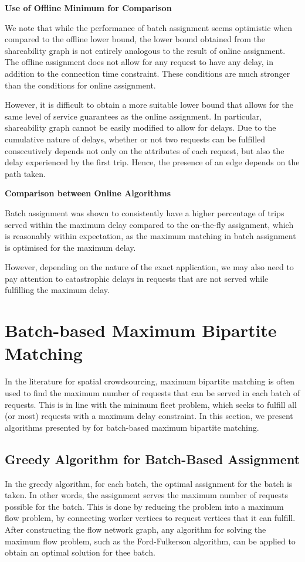 \documentclass[urop]{socreport}
\begin{document}
\vspace{2mm} \noindent \textbf{Use of Offline Minimum for Comparison}

\noindent We note that while the performance of batch assignment seems optimistic when compared to the offline lower bound, the lower bound obtained from the shareability graph is not entirely analogous to the result of online assignment. The offline assignment does not allow for any request to have any delay, in addition to the connection time constraint. These conditions are much stronger than the conditions for online assignment.

However, it is difficult to obtain a more suitable lower bound that allows for the same level of service guarantees as the online assignment. In particular, shareability graph cannot be easily modified to allow for delays. Due to the cumulative nature of delays, whether or not two requests can be fulfilled consecutively depends not only on the attributes of each request, but also the delay experienced by the first trip. Hence, the presence of an edge depends on the path taken.

\vspace{2mm} \noindent \textbf{Comparison between Online Algorithms}

\noindent Batch assignment was shown to consistently have a higher percentage of trips served within the maximum delay compared to the on-the-fly assignment, which is reasonably within expectation, as the maximum matching in batch assignment is optimised for the maximum delay.

However, depending on the nature of the exact application, we may also need to pay attention to catastrophic delays in requests that are not served while fulfilling the maximum delay.

\section{Batch-based Maximum Bipartite Matching}
In the literature for spatial crowdsourcing, maximum bipartite matching is often used to find the maximum number of requests that can be served in each batch of requests. This is in line with the minimum fleet problem, which seeks to fulfill all (or most) requests with a maximum delay constraint. In this section, we present algorithms presented by \cite{kazemi} for batch-based maximum bipartite matching.

\subsection{Greedy Algorithm for Batch-Based Assignment}
In the greedy algorithm, for each batch, the optimal assignment for the batch is taken. In other words, the assignment serves the maximum number of requests possible for the batch. This is done by reducing the problem into a maximum flow problem, by connecting worker vertices to request vertices that it can fulfill. After constructing the flow network graph, any algorithm for solving the maximum flow problem, such as the Ford-Fulkerson algorithm, can be applied to obtain an optimal solution for thee batch. 
\end{document}
